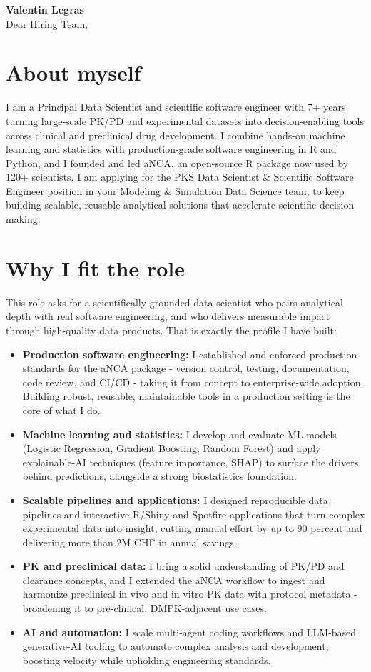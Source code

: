 \documentclass[11pt,a4paper]{article}
\newcommand{\Position}{PKS Data Scientist \& Scientific Software Engineer}
\begin{document}
{\Large\bfseries\color{accent} Valentin Legras}\\[8pt]

Dear Hiring Team,

\section{About myself}
I am a Principal Data Scientist and scientific software engineer with 7+ years
turning large-scale PK/PD and experimental datasets into decision-enabling tools
across clinical and preclinical drug development. I combine hands-on machine
learning and statistics with production-grade software engineering in R and
Python, and I founded and led aNCA, an open-source R package now used by 120+
scientists. I am applying for the \Position{} position in your Modeling \&
Simulation Data Science team, to keep building scalable, reusable analytical
solutions that accelerate scientific decision making.

\section{Why I fit the role}
This role asks for a scientifically grounded data scientist who pairs analytical
depth with real software engineering, and who delivers measurable impact through
high-quality data products. That is exactly the profile I have built:

\begin{itemize}
  \item \textbf{Production software engineering:} I established and enforced
        production standards for the aNCA package - version control, testing,
        documentation, code review, and CI/CD - taking it from concept to
        enterprise-wide adoption. Building robust, reusable, maintainable tools
        in a production setting is the core of what I do.
  \item \textbf{Machine learning and statistics:} I develop and evaluate ML
        models (Logistic Regression, Gradient Boosting, Random Forest) and apply
        explainable-AI techniques (feature importance, SHAP) to surface the
        drivers behind predictions, alongside a strong biostatistics foundation.
  \item \textbf{Scalable pipelines and applications:} I designed reproducible
        data pipelines and interactive R/Shiny and Spotfire applications that
        turn complex experimental data into insight, cutting manual effort by up
        to 90 percent and delivering more than 2M CHF in annual savings.
  \item \textbf{PK and preclinical data:} I bring a solid understanding of PK/PD
        and clearance concepts, and I extended the aNCA workflow to ingest and
        harmonize preclinical in vivo and in vitro PK data with protocol
        metadata - broadening it to pre-clinical, DMPK-adjacent use cases.
  \item \textbf{AI and automation:} I scale multi-agent coding workflows and
        LLM-based generative-AI tooling to automate complex analysis and
        development, boosting velocity while upholding engineering standards.
\end{itemize}
\end{document}

